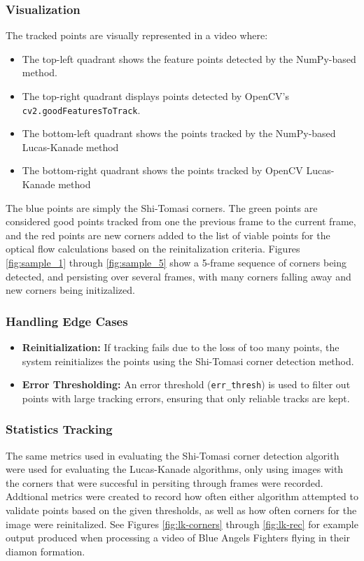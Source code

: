 \documentclass[11pt, conference, letterpaper]{IEEEtran}
\begin{document}
\subsubsection{Visualization}
The tracked points are visually represented in a video where:
\begin{itemize}
    \item The top-left quadrant shows the feature points detected by the NumPy-based method.
    \item The top-right quadrant displays points detected by OpenCV's \texttt{cv2.goodFeaturesToTrack}.
    \item The bottom-left quadrant shows the points tracked by the NumPy-based Lucas-Kanade method
    \item The bottom-right quadrant shows the points tracked by OpenCV Lucas-Kanade method
\end{itemize}
The blue points are simply the Shi-Tomasi corners. The green points are considered good points tracked from one the previous frame to the current frame, and the red points are new corners added to the list of viable points for the optical flow calculations based on the reinitalization criteria. Figures \ref{fig:sample_1} through \ref{fig:sample_5} show a 5-frame sequence of corners being detected, and persisting over several frames, with many corners falling away and new corners being initizalized.
\bigskip

\subsubsection{Handling Edge Cases}
\begin{itemize}
    \item \textbf{Reinitialization:} If tracking fails due to the loss of too many points, the system reinitializes the points using the Shi-Tomasi corner detection method.
    \item \textbf{Error Thresholding:} An error threshold (\texttt{err\_thresh}) is used to filter out points with large tracking errors, ensuring that only reliable tracks are kept.
\end{itemize}
\bigskip

\subsubsection{Statistics Tracking}
The same metrics used in evaluating the Shi-Tomasi corner detection algorith were used for evaluating the Lucas-Kanade algorithms, only using images with the corners that were succesful in persiting through frames were recorded. Addtional metrics were created to record how often either algorithm attempted to validate points based on the given thresholds, as well as how often corners for the image were reinitalized. See Figures \ref{fig:lk-corners} through \ref{fig:lk-rec} for example output produced when processing a video of Blue Angels Fighters flying in their diamon formation.
\bigskip
\end{document}
